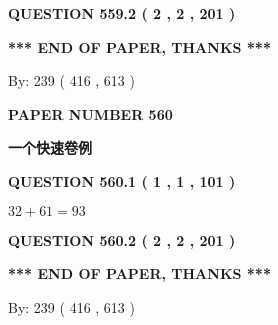 \documentclass{ctexart}
\begin{document}
{\textbf{\Large{QUESTION
559.2 
 ( 2 , 2 , 201 )
}}}
  
  
   
   
 \vspace{0.2in}
 
   
   
   
   
\vspace{1.0in} 
{\textbf{\large{ *** END OF PAPER, THANKS *** }}} 
   
   
\hspace{1.0in} By: 
 239 ( 416 ,  613 )
   
   
   
   
\newpage 
\setcounter{page}{ 
   560001 } 
   
   
   
   
 {\textbf{ \Large{ PAPER NUMBER  560  }}}
   
   
\vspace{0.2in}
   
   
   
   
   
   
 \vspace{0.2in}
{\LARGE {\textbf{ 一个快速卷例}}}
   
   
  
\vspace{0.2in}
  
{\textbf{\Large{QUESTION
560.1 
 ( 1 , 1 , 101 )
}}}
  
  
 
 

$ %
32 +  %
61=   %
93$
 
 
  
\vspace{0.2in}
  
{\textbf{\Large{QUESTION
560.2 
 ( 2 , 2 , 201 )
}}}
  
  
   
   
 \vspace{0.2in}
 
   
   
   
   
\vspace{1.0in} 
{\textbf{\large{ *** END OF PAPER, THANKS *** }}} 
   
   
\hspace{1.0in} By: 
 239 ( 416 ,  613 )
   
   
   
   
\newpage 
\setcounter{page}{ 
   561001 } 
   
\end{document}
